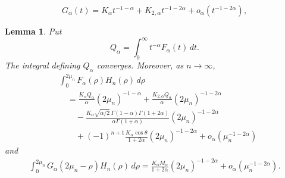 \documentclass[10pt,a4paper]{amsart}
\newtheorem{lemma}{Lemma}
\begin{document}
\begin{equation}\label{eq:Gsmall}
 G_\alpha(t)=K_\alpha t^{-1-\alpha}
 +K_{2,\alpha}t^{-1-2\alpha}+o_\alpha(t^{-1-2\alpha}),
\end{equation}

\begin{lemma}\label{lem:small-expansions}
Put
\[
 Q_\alpha=\int_0^\infty t^{-\alpha}F_\alpha(t)\,dt.
\]
The integral defining $Q_\alpha$ converges.  Moreover, as $n\to\infty$,
\begin{equation}\label{eq:FH-expansion}
\begin{aligned}
 &\int_0^{2\mu_n}F_\alpha(\rho)H_n(\rho)\,d\rho\\
 &\quad=\frac{K_\alpha Q_\alpha}{\alpha}(2\mu_n)^{-1-\alpha}
 +\frac{K_{2,\alpha}Q_\alpha}{\alpha}(2\mu_n)^{-1-2\alpha}\\
 &\qquad-\frac{K_\alpha\sqrt{\alpha/2}\,
 \Gamma(1-\alpha)\Gamma(1+2\alpha)}
 {\alpha\Gamma(1+\alpha)}(2\mu_n)^{-1-2\alpha}\\
 &\qquad+(-1)^{n+1}\frac{K_\alpha\cos\theta}{1+2\alpha}
 (2\mu_n)^{-1-2\alpha}
 +o_\alpha(\mu_n^{-1-2\alpha})
\end{aligned}
\end{equation}
and
\begin{equation}\label{eq:GH-expansion}
 \begin{aligned}
 \int_0^{2\mu_n}G_\alpha(2\mu_n-\rho)H_n(\rho)\,d\rho=\frac{K_\alpha M_\alpha}{1+2\alpha}
 (2\mu_n)^{-1-2\alpha}
 +o_\alpha(\mu_n^{-1-2\alpha}).
 \end{aligned}
\end{equation}
\end{lemma}
\end{document}
